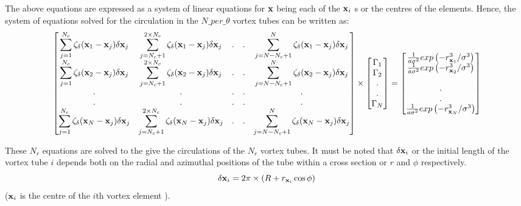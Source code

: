 \documentclass[10pt,a4paper]{report}
\newcommand{\xv}{{\bf x}}
\begin{document}
The above equations are expressed as a system of linear equations for $\xv$ being each of the $\xv_i$ s or the centres of the elements. Hence, the system of equations solved for the circulation in the $N\_per\_\theta$ vortex tubes can be written as:
\begin{dmath}
\begin{bmatrix}
\displaystyle \sum_{j=1}^{N_c} \zeta_\delta( \xv_1 - \xv_j) \delta \xv_j & \displaystyle \sum_{j=N_c + 1}^{2\times N_c} \zeta_\delta( \xv_1 - \xv_j) \delta \xv_j & . & . &  \displaystyle \sum_{j= N - N_c + 1}^{N} \zeta_\delta( \xv_1 - \xv_j) \delta \xv_j \\ 
\displaystyle \sum_{j=1}^{N_c} \zeta_\delta( \xv_2 - \xv_j) \delta \xv_j & \displaystyle \sum_{j=N_c + 1}^{2\times N_c} \zeta_\delta( \xv_2 - \xv_j) \delta \xv_j & . & . &  \displaystyle \sum_{j=N - N_c + 1}^{N} \zeta_\delta( \xv_2 - \xv_j) \delta \xv_j \\ 
. & . & . & . & . \\ 
. & . & . & . & . \\
\displaystyle \sum_{j=1}^{N_c} \zeta_\delta( \xv_N - \xv_j) \delta \xv_j & \displaystyle \sum_{j=N_c + 1}^{2\times N_c} \zeta_\delta( \xv_N - \xv_j) \delta \xv_j & . & . &  \displaystyle \sum_{j=N - N_c + 1}^N \zeta_\delta( \xv_N - \xv_j) \delta \xv_j \\ 
\end{bmatrix}
 \times 
\begin{bmatrix}
\Gamma_1 \\
\Gamma_2 \\
. \\
. \\
\Gamma_N
\end{bmatrix}
=
\begin{bmatrix}
\frac{1}{a\sigma^2} exp\left(-r_{\xv_1}^3/\sigma^3\right) \\
\frac{1}{a\sigma^2} exp\left(-r_{\xv_2}^3/\sigma^3\right) \\ \\
. \\
. \\
\frac{1}{a\sigma^2} exp\left(-r_{\xv_N}^3/\sigma^3\right) \\
\end{bmatrix}
\end{dmath}

These $N_r$ equations are solved to the give the circulations of the $N_r$ vortex tubes.
It must be noted that $\delta \xv_i $ or the initial length of the vortex tube $i$ depends both on the radial and azimuthal positions of the tube within a cross section or $r$ and $\phi$ respectively.
\begin{equation}
\delta \xv_i = 2 \pi \times ( R + r_{\xv_i} \cos \phi ) 
\end{equation}
($ \xv_i $ is the centre of the $i$th vortex element ).
\end{document}
